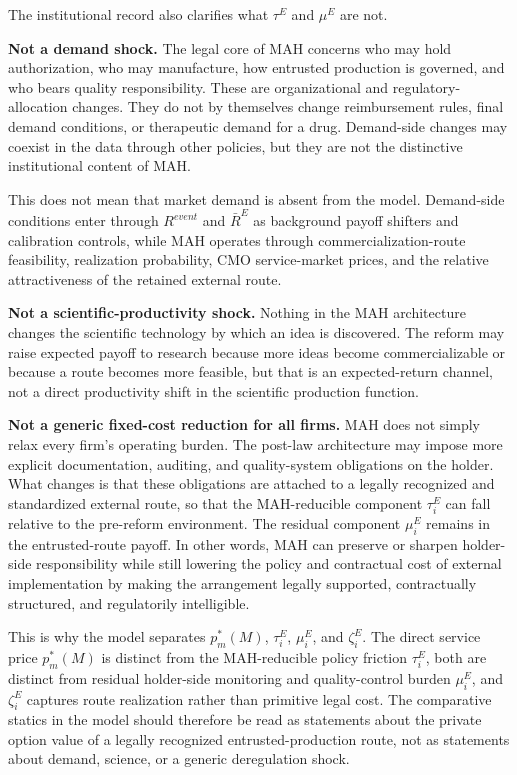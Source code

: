 \documentclass[12pt]{article}
\newcommand{\1}{\mathbf{1}}
\begin{document}
The institutional record also clarifies what $\tau^E$ and $\mu^E$ are not.

\textbf{Not a demand shock.} The legal core of MAH concerns who may hold authorization, who may manufacture, how entrusted production is governed, and who bears quality responsibility. These are organizational and regulatory-allocation changes. They do not by themselves change reimbursement rules, final demand conditions, or therapeutic demand for a drug. Demand-side changes may coexist in the data through other policies, but they are not the distinctive institutional content of MAH.

This does not mean that market demand is absent from the model. Demand-side conditions enter through $R^{event}$ and $\bar R^E$ as background payoff shifters and calibration controls, while MAH operates through commercialization-route feasibility, realization probability, CMO service-market prices, and the relative attractiveness of the retained external route.

\textbf{Not a scientific-productivity shock.} Nothing in the MAH architecture changes the scientific technology by which an idea is discovered. The reform may raise expected payoff to research because more ideas become commercializable or because a route becomes more feasible, but that is an expected-return channel, not a direct productivity shift in the scientific production function.

\textbf{Not a generic fixed-cost reduction for all firms.} MAH does not simply relax every firm's operating burden. The post-law architecture may impose more explicit documentation, auditing, and quality-system obligations on the holder. What changes is that these obligations are attached to a legally recognized and standardized external route, so that the MAH-reducible component $\tau_i^E$ can fall relative to the pre-reform environment. The residual component $\mu_i^E$ remains in the entrusted-route payoff. In other words, MAH can preserve or sharpen holder-side responsibility while still lowering the policy and contractual cost of external implementation by making the arrangement legally supported, contractually structured, and regulatorily intelligible.

This is why the model separates $p_m^*(M)$, $\tau_i^E$, $\mu_i^E$, and $\zeta_i^E$. The direct service price $p_m^*(M)$ is distinct from the MAH-reducible policy friction $\tau_i^E$, both are distinct from residual holder-side monitoring and quality-control burden $\mu_i^E$, and $\zeta_i^E$ captures route realization rather than primitive legal cost. The comparative statics in the model should therefore be read as statements about the private option value of a legally recognized entrusted-production route, not as statements about demand, science, or a generic deregulation shock.
\end{document}
